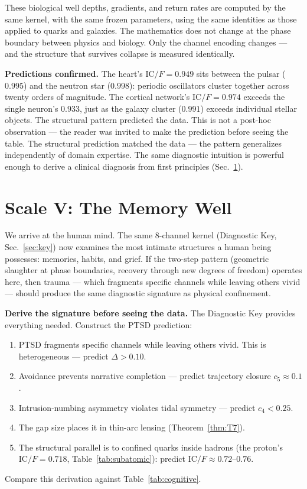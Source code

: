 \documentclass[
  aps,
  prd,
  twocolumn,
  superscriptaddress,
  nofootinbib,
  floatfix
]{revtex4-2}
\newcommand{\IC}{\mathrm{IC}}
\begin{document}
These biological well depths, gradients, and return rates
are computed by the same kernel, with the same frozen
parameters, using the same identities as those applied to
quarks and galaxies.  The mathematics does not change at the
phase boundary between physics and biology.  Only the channel
encoding changes --- and the structure that survives collapse
is measured identically.

\textbf{Predictions confirmed.}
The heart's $\IC/F = 0.949$ sits between the pulsar
($0.995$) and the neutron star ($0.998$): periodic
oscillators cluster together across twenty orders of
magnitude.  The cortical network's $\IC/F = 0.974$ exceeds
the single neuron's $0.933$, just as the galaxy cluster
($0.991$) exceeds individual stellar objects.  The structural
pattern predicted the data.  This is not a post-hoc
observation --- the reader was invited to make the
prediction before seeing the table.  The structural
prediction matched the data --- the pattern generalizes
independently of domain expertise.  The same diagnostic
intuition is powerful enough to derive a clinical diagnosis
from first principles (Sec.~\ref{sec:memory}).


\section{Scale V: The Memory Well}\label{sec:memory}

We arrive at the human mind.  The same 8-channel kernel
(Diagnostic Key, Sec.~\ref{sec:key}) now examines the most
intimate structures a human being possesses: memories,
habits, and grief.  If the two-step pattern
(geometric slaughter at phase boundaries, recovery through
new degrees of freedom) operates here, then trauma ---
which fragments specific channels while leaving others
vivid --- should produce the same diagnostic signature
as physical confinement.

\textbf{Derive the signature before seeing the data.}
The Diagnostic Key provides everything needed.  Construct
the PTSD prediction:
\begin{enumerate}
\item PTSD fragments specific channels while leaving others
  vivid.  This is heterogeneous --- predict $\Delta > 0.10$.
\item Avoidance prevents narrative completion --- predict
  trajectory closure $c_5 \approx 0.1$.
\item Intrusion-numbing asymmetry violates tidal symmetry ---
  predict $c_4 < 0.25$.
\item The gap size places it in thin-arc lensing
  (Theorem~\ref{thm:T7}).
\item The structural parallel is to confined quarks inside
  hadrons (the proton's $\IC/F = 0.718$,
  Table~\ref{tab:subatomic}): predict $\IC/F \approx
  0.72$--$0.76$.
\end{enumerate}
Compare this derivation against Table~\ref{tab:cognitive}.
\end{document}
